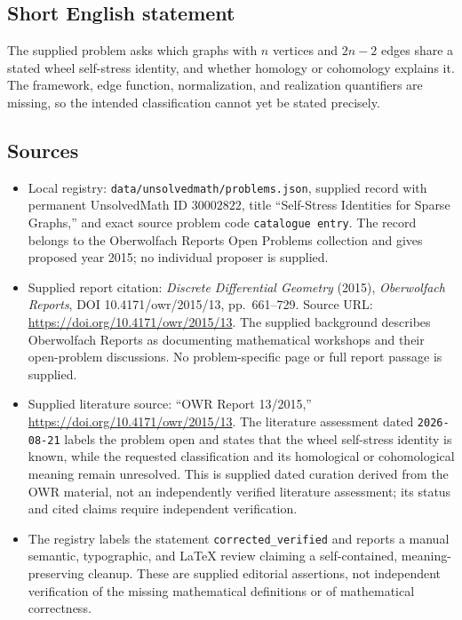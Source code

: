 \documentclass[11pt]{article}
\begin{document}
\subsection{Short English statement}
The supplied problem asks which graphs with \(n\) vertices and \(2n-2\) edges share a stated wheel self-stress identity, and whether homology or cohomology explains it. The framework, edge function, normalization, and realization quantifiers are missing, so the intended classification cannot yet be stated precisely.
\subsection{Sources}
\begin{itemize}
\item Local registry: \texttt{data/unsolvedmath/problems.json}, supplied record with permanent UnsolvedMath ID \(30002822\), title ``Self-Stress Identities for Sparse Graphs,'' and exact source problem code \texttt{catalogue entry}. The record belongs to the Oberwolfach Reports Open Problems collection and gives proposed year 2015; no individual proposer is supplied.
\item Supplied report citation: \emph{Discrete Differential Geometry} (2015), \emph{Oberwolfach Reports}, DOI 10.4171/owr/2015/13, pp.~661--729. Source URL: \url{https://doi.org/10.4171/owr/2015/13}. The supplied background describes Oberwolfach Reports as documenting mathematical workshops and their open-problem discussions. No problem-specific page or full report passage is supplied.
\item Supplied literature source: ``OWR Report 13/2015,'' \url{https://doi.org/10.4171/owr/2015/13}. The literature assessment dated \texttt{2026-08-21} labels the problem open and states that the wheel self-stress identity is known, while the requested classification and its homological or cohomological meaning remain unresolved. This is supplied dated curation derived from the OWR material, not an independently verified literature assessment; its status and cited claims require independent verification.
\item The registry labels the statement \texttt{corrected\_verified} and reports a manual semantic, typographic, and LaTeX review claiming a self-contained, meaning-preserving cleanup. These are supplied editorial assertions, not independent verification of the missing mathematical definitions or of mathematical correctness.
\end{itemize}
\end{document}
